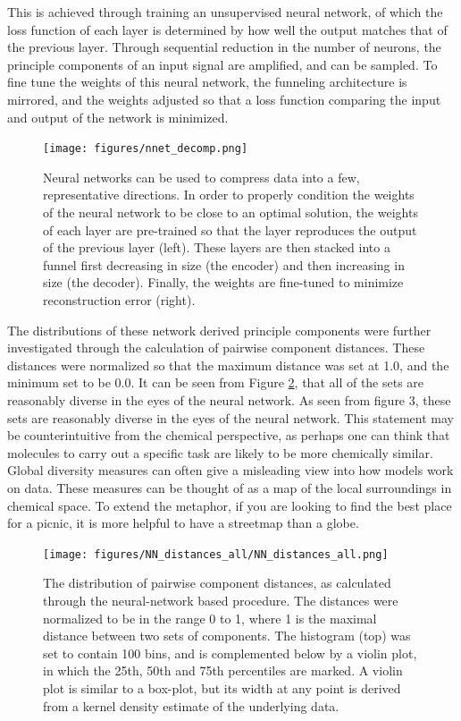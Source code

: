 \documentclass{pnastwo}
\begin{document}
\begin{article}
This is achieved through training an unsupervised neural network, of which the loss function of each layer is determined by how well the output matches that of the previous layer.  Through sequential reduction in the number of neurons, the principle components of an input signal are amplified, and can be sampled.  To fine tune the weights of this neural network, the funneling architecture is mirrored, and the weights adjusted so that a loss function comparing the input and output of the network is minimized.  
\begin{figure}[h!]
\centering
\texttt{[image: figures/nnet\_decomp.png]}
\caption{Neural networks can be used to compress data into a few, representative directions. In order to properly condition the weights of the neural network to be close to an optimal solution, the weights of each layer are pre-trained so that the layer reproduces the output of the previous layer (left).  These layers are then stacked into a funnel first decreasing in size (the encoder) and then increasing in size (the decoder).  Finally, the weights are fine-tuned to minimize reconstruction error (right).}
\label{fig:nn_decomp}
\end{figure}
The distributions of these network derived principle components were further investigated through the calculation of pairwise component distances. These distances were normalized so that the maximum distance was set at 1.0, and the minimum set to be 0.0. It can be seen from Figure \ref{fig:dist_hists}, that all of the sets are reasonably diverse in the eyes of the neural network.  As seen from figure 3, these sets are reasonably diverse in the eyes of the neural network. This statement may be counterintuitive from the chemical perspective, as perhaps one can think that molecules to carry out a specific task are likely to be more chemically similar. Global diversity measures can often give a misleading view into how models work on data. These measures can be thought of as a map of the local surroundings in chemical space.  To extend the metaphor, if you are looking to find the best place for a picnic, it is more helpful to have a streetmap than a globe.
  
  

\begin{figure}[h!]
\centering
\texttt{[image: figures/NN\_distances\_all/NN\_distances\_all.png]}
\caption{The distribution of pairwise component distances, as calculated through the neural-network based procedure.  The distances were normalized to be in the range 0 to 1, where 1 is the maximal distance between two sets of components.  The histogram (top) was set to contain 100 bins, and is complemented below by a violin plot, in which the 25th, 50th and 75th percentiles are marked.  A violin plot is similar to a box-plot, but its width at any point is derived from a kernel density estimate of the underlying data.}
\label{fig:dist_hists}
\end{figure}


\end{article}
\end{document}
